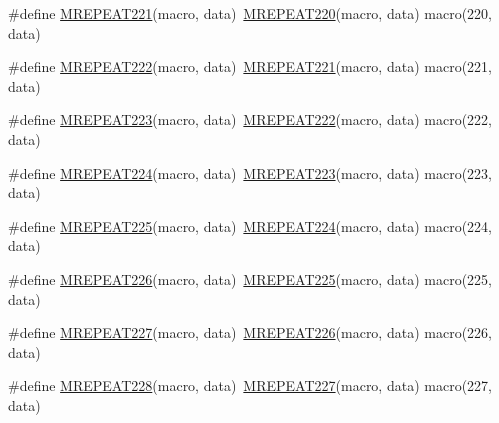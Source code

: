 \begin{DoxyCompactItemize}
\item 
\#define \mbox{\hyperlink{group__group__sam0__utils__mrepeat_ga8b900659b10dcbf3db345acef26f242c}{M\+R\+E\+P\+E\+A\+T221}}(macro,  data)~\mbox{\hyperlink{group__group__sam0__utils__mrepeat_ga87b159389edf9a6b6f2e0fcf17139964}{M\+R\+E\+P\+E\+A\+T220}}(macro, data)   macro(220, data)
\item 
\#define \mbox{\hyperlink{group__group__sam0__utils__mrepeat_ga8a7acdd582f6480ff0ba12258858670f}{M\+R\+E\+P\+E\+A\+T222}}(macro,  data)~\mbox{\hyperlink{group__group__sam0__utils__mrepeat_ga8b900659b10dcbf3db345acef26f242c}{M\+R\+E\+P\+E\+A\+T221}}(macro, data)   macro(221, data)
\item 
\#define \mbox{\hyperlink{group__group__sam0__utils__mrepeat_ga6d10ab8a91d39e5445dd73345376b1c0}{M\+R\+E\+P\+E\+A\+T223}}(macro,  data)~\mbox{\hyperlink{group__group__sam0__utils__mrepeat_ga8a7acdd582f6480ff0ba12258858670f}{M\+R\+E\+P\+E\+A\+T222}}(macro, data)   macro(222, data)
\item 
\#define \mbox{\hyperlink{group__group__sam0__utils__mrepeat_ga3b9133ba29da0660d2b743093e68538a}{M\+R\+E\+P\+E\+A\+T224}}(macro,  data)~\mbox{\hyperlink{group__group__sam0__utils__mrepeat_ga6d10ab8a91d39e5445dd73345376b1c0}{M\+R\+E\+P\+E\+A\+T223}}(macro, data)   macro(223, data)
\item 
\#define \mbox{\hyperlink{group__group__sam0__utils__mrepeat_ga7a35ac51829f1231cd1f15d17bd69e90}{M\+R\+E\+P\+E\+A\+T225}}(macro,  data)~\mbox{\hyperlink{group__group__sam0__utils__mrepeat_ga3b9133ba29da0660d2b743093e68538a}{M\+R\+E\+P\+E\+A\+T224}}(macro, data)   macro(224, data)
\item 
\#define \mbox{\hyperlink{group__group__sam0__utils__mrepeat_ga4a34529f9fa47949482c0d37bdacd3c8}{M\+R\+E\+P\+E\+A\+T226}}(macro,  data)~\mbox{\hyperlink{group__group__sam0__utils__mrepeat_ga7a35ac51829f1231cd1f15d17bd69e90}{M\+R\+E\+P\+E\+A\+T225}}(macro, data)   macro(225, data)
\item 
\#define \mbox{\hyperlink{group__group__sam0__utils__mrepeat_ga395d7e09979a131155a9b2fcfa84b06e}{M\+R\+E\+P\+E\+A\+T227}}(macro,  data)~\mbox{\hyperlink{group__group__sam0__utils__mrepeat_ga4a34529f9fa47949482c0d37bdacd3c8}{M\+R\+E\+P\+E\+A\+T226}}(macro, data)   macro(226, data)
\item 
\#define \mbox{\hyperlink{group__group__sam0__utils__mrepeat_ga1976e9b1599c79c7dd75bdeefb924fba}{M\+R\+E\+P\+E\+A\+T228}}(macro,  data)~\mbox{\hyperlink{group__group__sam0__utils__mrepeat_ga395d7e09979a131155a9b2fcfa84b06e}{M\+R\+E\+P\+E\+A\+T227}}(macro, data)   macro(227, data)

\end{DoxyCompactItemize}
